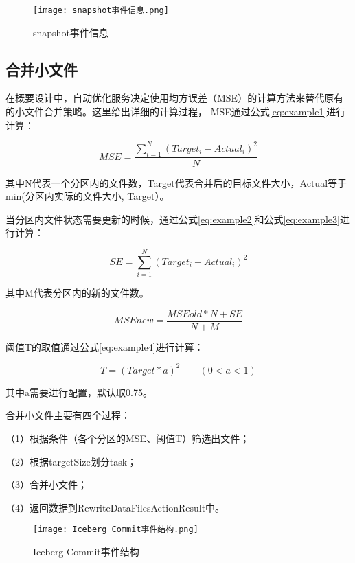 \begin{figure}[H]
  \centering
  \texttt{[image: snapshot事件信息.png]}
  \caption{snapshot事件信息}
  \label{fig:snapshot事件信息}
\end{figure}

\subsection{合并小文件}

在概要设计中，自动优化服务决定使用均方误差（MSE）的计算方法来替代原有的小文件合并策略。这里给出详细的计算过程，
MSE通过公式\ref{eq:example1}进行计算：

\begin{equation}
  MSE=\frac {\sum_{i=1}^{N}{(Target_i - Actual_i)^2}} {N}
  \label{eq:example1}
\end{equation}

其中N代表一个分区内的文件数，Target代表合并后的目标文件大小，Actual等于min(分区内实际的文件大小, Target）。

当分区内文件状态需要更新的时候，通过公式\ref{eq:example2}和公式\ref{eq:example3}进行计算：

\begin{equation}
  SE=\sum_{i=1}^{N}{(Target_i - Actual_i)^2}
  \label{eq:example2}
\end{equation}

其中M代表分区内的新的文件数。

\begin{equation}
  MSEnew=\frac {MSEold*N+SE} {N+M}
  \label{eq:example3}
\end{equation}

阈值T的取值通过公式\ref{eq:example4}进行计算：

\begin{equation}
  T=(Target*a)^2 \qquad (0<a<1)
  \label{eq:example4}
\end{equation}

其中a需要进行配置，默认取0.75。

合并⼩⽂件主要有四个过程：

（1）根据条件（各个分区的MSE、阈值T）筛选出⽂件；

（2）根据targetSize划分task；

（3）合并⼩⽂件；

（4）返回数据到RewriteDataFilesActionResult中。

\begin{figure}[H]
  \centering
  \texttt{[image: Iceberg Commit事件结构.png]}
  \caption{Iceberg Commit事件结构}
  \label{fig:Commit事件结构}
\end{figure}

